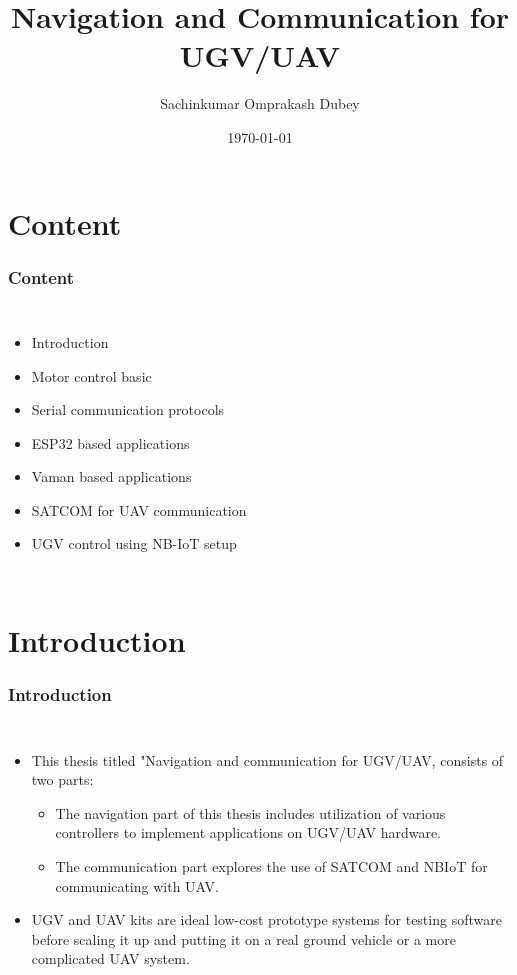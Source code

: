 \documentclass{beamer}
\title{Navigation and Communication for UGV/UAV}
\author{Sachinkumar Omprakash Dubey}
\institute{Indian Institute of Technology, Hyderabad.}
\date{\today}
\begin{document}
\begin{frame}
\titlepage
\end{frame}
\section{Content}
\begin{frame}
\frametitle{Content}
\begin{columns}
  \begin{itemize}
  \item Introduction
  \item Motor control basic
  \item Serial communication protocols
  \item ESP32 based applications
  \item Vaman based applications
  \item SATCOM for UAV communication
  \item UGV control using NB-IoT setup
  \end{itemize}
\end{columns}

\end{frame}


\section{Introduction}
\begin{frame}
\frametitle{Introduction}
\begin{columns}
  \begin{itemize}
  \item This thesis titled "Navigation and communication for UGV/UAV, consists of two parts:
   \begin{itemize}
  \item The navigation part of this thesis includes utilization of various controllers to implement applications on UGV/UAV hardware.
  \item The communication part explores the use of SATCOM and NBIoT for communicating with UAV.
  \end{itemize}
  \item UGV and UAV kits are ideal low-cost prototype systems for testing software before scaling it up and putting it on a real ground vehicle or a more complicated UAV system. 
  \end{itemize}
\end{columns}
\end{frame}
\end{document}
